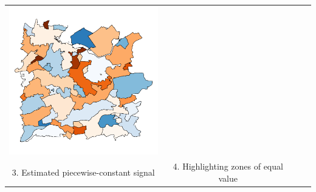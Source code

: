 \documentclass{standalone}
\begin{document}
\begin{tabular}[h]{cccc}
				\includegraphics[width = 7cm, keepaspectratio]{../figure/graphical_abstract/graphical_abstract_utrecht_district4.pdf} \vspace{-0.5cm}\\
				3. Estimated piecewise-constant signal & 4. Highlighting zones of equal value
\end{tabular}
\end{document}
